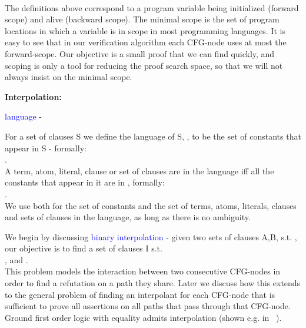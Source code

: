 \bigskip
{}\\
\bigskip

\noindent
The definitions above correspond to a program variable being initialized 
(forward scope) and alive (backward scope).
The minimal scope is the set of program locations in which a variable is in scope in most programming languages.
It is easy to see that in our verification algorithm each CFG-node uses at most the forward-scope.
Our objective is a small proof that we can find quickly, and scoping is only a tool for reducing the proof search space, so that we will not always insist on the minimal scope.

\bigskip

\noindent
\textbf{Interpolation:}
\begin{definition}{\textcolor{blue}{language} - \textcolor{blue}{}}

\noindent
For a set of clauses S we define the language of S, , to be the set of constants that appear in S - formally:\\
.\\
A term, atom, literal, clause or set of clauses are in the language \lang{} iff all the constants that appear in it are in \lang{}, formally:\\
.\\
We use \lang{} both for the set of constants and the set of terms, atoms, literals, clauses and sets of clauses in the language,
as long as there is no ambiguity.
\end{definition}

We begin by discussing \textcolor{blue}{binary interpolation} - given two sets of clauses A,B, s.t. , our objective is to find a set of clauses I s.t. \\
,  and . \\
This problem models the interaction between two consecutive CFG-nodes in order to find a refutation on a path they share. Later we discuss how this extends to the general problem of finding an interpolant for each CFG-node that is sufficient to prove all assertions on all paths that pass through that CFG-node.\\
Ground first order logic with equality admits interpolation (shown e.g. in ~\cite{McMillan04}).

